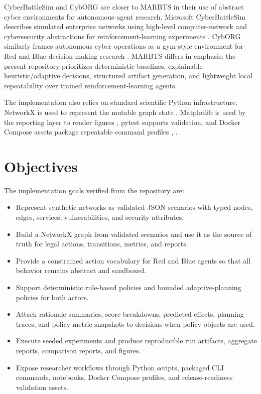 \documentclass[conference]{IEEEtran}
\begin{document}
CyberBattleSim and CybORG are closer to MARBTS in their use of abstract cyber environments for autonomous-agent research. Microsoft CyberBattleSim describes simulated enterprise networks using high-level computer-network and cybersecurity abstractions for reinforcement-learning experiments \cite{cyberbattle}. CybORG similarly frames autonomous cyber operations as a gym-style environment for Red and Blue decision-making research \cite{cyborg}. MARBTS differs in emphasis: the present repository prioritizes deterministic baselines, explainable heuristic/adaptive decisions, structured artifact generation, and lightweight local repeatability over trained reinforcement-learning agents.

The implementation also relies on standard scientific Python infrastructure. NetworkX is used to represent the mutable graph state \cite{networkx}, Matplotlib is used by the reporting layer to render figures \cite{matplotlib}, pytest supports validation, and Docker Compose assets package repeatable command profiles \cite{pytest}, \cite{compose}.

\section{Objectives}
The implementation goals verified from the repository are:

\begin{itemize}
    \item Represent synthetic networks as validated JSON scenarios with typed nodes, edges, services, vulnerabilities, and security attributes.
    \item Build a NetworkX graph from validated scenarios and use it as the source of truth for legal actions, transitions, metrics, and reports.
    \item Provide a constrained action vocabulary for Red and Blue agents so that all behavior remains abstract and sandboxed.
    \item Support deterministic rule-based policies and bounded adaptive-planning policies for both actors.
    \item Attach rationale summaries, score breakdowns, predicted effects, planning traces, and policy metric snapshots to decisions when policy objects are used.
    \item Execute seeded experiments and produce reproducible run artifacts, aggregate reports, comparison reports, and figures.
    \item Expose researcher workflows through Python scripts, packaged CLI commands, notebooks, Docker Compose profiles, and release-readiness validation assets.
\end{itemize}
\end{document}
